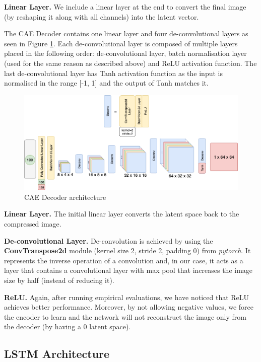 \textbf{Linear Layer.} We include a linear layer at the end to convert the final image (by reshaping it along with all channels) into the latent vector.

The CAE Decoder contains one linear layer and four de-convolutional layers as seen in Figure \ref{fig:caelstm_section_cae_kernel_decoder}.  Each de-convolutional layer is composed of multiple layers placed in the following order: de-convolutional layer, batch normalisation layer (used for the same reason as described above) and ReLU activation function. The last de-convolutional layer has Tanh activation function as the input is normalised in the range [-1, 1] and the output of Tanh matches it.

\begin{figure}[h!]
    \centerfloat
    \includegraphics[scale=0.45]{images/caelstm_section_cae_kernel_decoder.png}
    \caption{CAE Decoder architecture}
    \label{fig:caelstm_section_cae_kernel_decoder}
\end{figure}

\textbf{Linear Layer.} The initial linear layer converts the latent space back to the compressed image.

\textbf{De-convolutional Layer.} De-convolution is achieved by using the \textbf{ConvTranspose2d} module (kernel size 2, stride 2, padding 0) from \textit{pytorch}. It represents the inverse operation of a convolution and, in our case, it acts as a layer that contains a convolutional layer with max pool that increases the image size by half (instead of reducing it).

\textbf{ReLU.} Again, after running empirical evaluations, we have noticed that ReLU achieves better performance. Moreover, by not allowing negative values, we force the encoder to learn and the network will not reconstruct the image only from the decoder (by having a 0 latent space).

\pagebreak

\subsection{LSTM Architecture}

